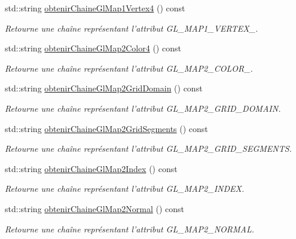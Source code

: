 \begin{DoxyCompactItemize}
std\-::string \hyperlink{group__utilitaire_gab130a35770d4594bf74a89d18c49697a}{obtenir\-Chaine\-Gl\-Map1\-Vertex4} () const 
\begin{DoxyCompactList}\small\item\em Retourne une chaîne représentant l'attribut G\-L\-\_\-\-M\-A\-P1\-\_\-\-V\-E\-R\-T\-E\-X\-\_. \end{DoxyCompactList}\item 
std\-::string \hyperlink{group__utilitaire_ga85dca50f7d25944ca4158173a630d15d}{obtenir\-Chaine\-Gl\-Map2\-Color4} () const 
\begin{DoxyCompactList}\small\item\em Retourne une chaîne représentant l'attribut G\-L\-\_\-\-M\-A\-P2\-\_\-\-C\-O\-L\-O\-R\-\_. \end{DoxyCompactList}\item 
std\-::string \hyperlink{group__utilitaire_ga15f308a3995cd63e0bf8ff13fd1024dd}{obtenir\-Chaine\-Gl\-Map2\-Grid\-Domain} () const 
\begin{DoxyCompactList}\small\item\em Retourne une chaîne représentant l'attribut G\-L\-\_\-\-M\-A\-P2\-\_\-\-G\-R\-I\-D\-\_\-\-D\-O\-M\-A\-I\-N. \end{DoxyCompactList}\item 
std\-::string \hyperlink{group__utilitaire_ga7cc72b6b6d1f670c6bb2a37bb02f22cc}{obtenir\-Chaine\-Gl\-Map2\-Grid\-Segments} () const 
\begin{DoxyCompactList}\small\item\em Retourne une chaîne représentant l'attribut G\-L\-\_\-\-M\-A\-P2\-\_\-\-G\-R\-I\-D\-\_\-\-S\-E\-G\-M\-E\-N\-T\-S. \end{DoxyCompactList}\item 
std\-::string \hyperlink{group__utilitaire_ga5c26c0fce87b7c852f2819ddbc816835}{obtenir\-Chaine\-Gl\-Map2\-Index} () const 
\begin{DoxyCompactList}\small\item\em Retourne une chaîne représentant l'attribut G\-L\-\_\-\-M\-A\-P2\-\_\-\-I\-N\-D\-E\-X. \end{DoxyCompactList}\item 
std\-::string \hyperlink{group__utilitaire_ga281e64b376bb0c3f7f7090820a64bd7e}{obtenir\-Chaine\-Gl\-Map2\-Normal} () const 
\begin{DoxyCompactList}\small\item\em Retourne une chaîne représentant l'attribut G\-L\-\_\-\-M\-A\-P2\-\_\-\-N\-O\-R\-M\-A\-L. \end{DoxyCompactList}\item 

\end{DoxyCompactItemize}
